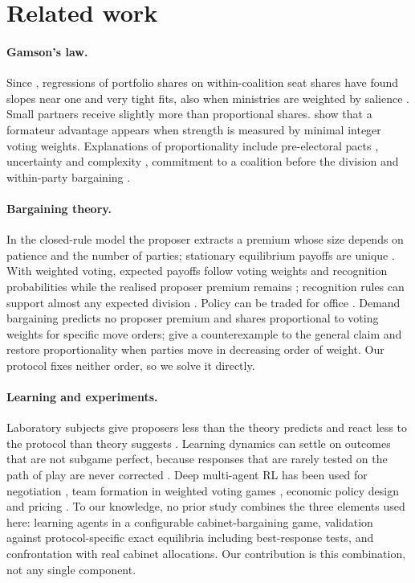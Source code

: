 \documentclass[11pt,a4paper]{article}
\begin{document}
\section{Related work}\label{sec:related}
\paragraph{Gamson's law.} Since \citet{browne1973}, regressions of portfolio shares on within-coalition
seat shares have found slopes near one and very tight fits, also when ministries are weighted by
salience \citep{warwick2001,warwick2006}. Small partners receive slightly more than proportional shares.
\citet{ansolabehere2005} show that a formateur advantage appears when strength is measured by minimal
integer voting weights. Explanations of proportionality include pre-electoral pacts
\citep{carroll2007}, uncertainty and complexity \citep{falco2013}, commitment to a coalition before the
division \citep{kamm2024} and within-party bargaining \citep{cox2021}.

\paragraph{Bargaining theory.} In the closed-rule model \citep{baron1989} the proposer extracts a premium
whose size depends on patience and the number of parties; stationary equilibrium payoffs are unique
\citep{eraslan2002}. With weighted voting, expected payoffs follow voting weights and recognition
probabilities while the realised proposer premium remains \citep{snyder2005}; recognition rules can
support almost any expected division \citep{kalandrakis2006}. Policy can be traded for office
\citep{baron1991,laver1996}. Demand bargaining \citep{morelli1999} predicts no proposer premium and
shares proportional to voting weights for specific move orders; \citet{montero2007} give a
counterexample to the general claim and \citet{montero2011} restore proportionality when parties move in
decreasing order of weight. Our protocol fixes neither order, so we solve it directly.

\paragraph{Learning and experiments.} Laboratory subjects give proposers less than the theory predicts
\citep{frechette2003} and react less to the protocol than theory suggests \citep{frechette2005}.
Learning dynamics can settle on outcomes that are not subgame perfect, because responses that are rarely
tested on the path of play are never corrected \citep{gale1995,fudenberg1993,fudenberg1998}. Deep
multi-agent RL has been used for negotiation \citep{lewis2017}, team formation in weighted voting games
\citep{bachrach2020}, economic policy design \citep{zheng2022} and pricing \citep{calvano2020}. To our knowledge, no prior study combines the three elements used here: learning agents in a
configurable cabinet-bargaining game, validation against protocol-specific exact equilibria including
best-response tests, and confrontation with real cabinet allocations. Our contribution is this
combination, not any single component.
\end{document}

